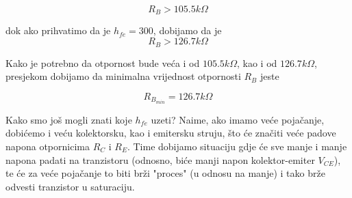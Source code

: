 \documentclass{article}
\begin{document}
        \begin{equation}
            R_B > 105.5 k\Omega
        \end{equation}

        dok ako prihvatimo da je $h_{fe} = 300$, dobijamo da je
        \begin{equation}
            R_B > 126.7 k\Omega
        \end{equation}

        Kako je potrebno da otpornost bude veća i od $105.5 k\Omega$, kao i od $126.7 k\Omega$, 
        presjekom dobijamo da minimalna vrijednost otpornosti $R_B$ jeste

        \begin{equation}
            R_{B_{min}} = 126.7 k\Omega
        \end{equation}

        Kako smo još mogli znati koje $h_{fe}$ uzeti? Naime, ako imamo veće pojačanje,
        dobićemo i veću kolektorsku, kao i emitersku struju, što će značiti veće padove
        napona otpornicima $R_C$ i $R_E$. Time dobijamo situaciju gdje će sve manje i manje
        napona padati na tranzistoru (odnosno, biće manji napon kolektor-emiter $V_{CE}$), 
        te će za veće pojačanje to biti brži "proces" (u odnosu na manje) 
        i tako brže odvesti tranzistor u saturaciju.
\end{document}
